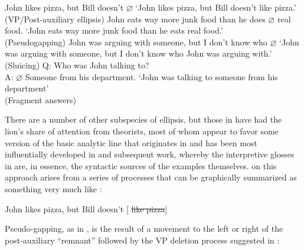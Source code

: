 \documentclass[output=paper,colorlinks,citecolor=brown]{langscibook}
\begin{document}
\begin{exe}
 \ex\label{ellipsis}
  \begin{xlist}
 \ex\label{VPE}
    John likes pizza, but Bill doesn't $\varnothing$ \bsl{}
    \glt `John likes pizza, but Bill doesn't like pizza.' \\
    (VP/Post-auxiliary ellipsis)
 \ex\label{pseudo}
    John eats way more junk food than he does $\varnothing$ real food.
    \glt `John eats way more junk food than he eats real food.' \\
    (Pseudogapping)
 \ex\label{sluice}
    John was arguing with someone, but I don't know who $\varnothing$ \bsl{}
    \glt `John was arguing with someone, but I don't know who John was
  arguing with.' \\
    (Sluicing)
 \ex\label{shortans}
   Q: Who was John talking to? \\
   A: $\varnothing$ Someone from his department.
   \glt `John was talking to someone from his department'\\
   (Fragment answers)
  \end{xlist}
\end{exe}
There are a number of other subspecies of ellipsis, but those in
 have had the lion's share of attention from theorists, most
of whom appear to favor some version of the basic analytic line 
that originates in \citet{kuno81} and has been most influentially developed
in \citet{merchant01} and subsequent work, whereby the interpretive glosses
in  are, in essence, the syntactic sources of the examples
themselves.  on this approach arises from a series of processes
that can be graphically summarized as something very much like
:

\begin{exe}
 \ex\label{VPdeletion}
  John likes pizza, but Bill doesn't [ \sout{like pizza}]
\end{exe}
Pseudo-gapping, as in , is the result of a movement to the
left or right of the post-auxiliary ``remnant'' followed by the VP
deletion process suggested in :
\end{document}
